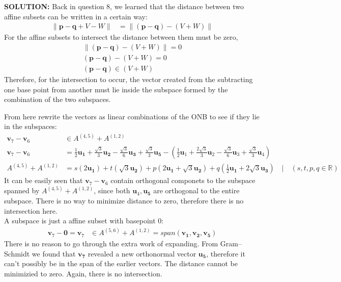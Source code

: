 \documentclass[12pt]{article}
\begin{document}
\begin{enumerate}
          \textbf{SOLUTION:}
          Back in question 8, we learned that the distance between two affine subsets can be written in a certain way:
          \begin{align*}
              \| \mathbf{p}-\mathbf{q} + V - W \| & = \|(\mathbf{p}-\mathbf{q}) - (V + W)\|
          \end{align*}
          For the affine subsets to intersect the distance between them must be zero,
          \begin{align*}
              \|(\mathbf{p}-\mathbf{q}) - (V + W)\| = 0 \\
              (\mathbf{p}-\mathbf{q}) - (V + W) = 0     \\
              (\mathbf{p}-\mathbf{q}) \in{} (V+W)
          \end{align*}
          Therefore, for the intersection to occur, the vector created from the subtracting one base point from another must lie inside the subspace formed by the combination of the two subspaces.

          From here rewrite the vectors as linear combinations of the ONB to see if they lie in the subspaces:
          \begin{align*}
              \mathbf{v}_7-\mathbf{v}_6 & \in{} A^{(4,5)} + A^{(1,2)}                                                                                                               \\
              \mathbf{v}_7-\mathbf{v}_6 & = \tfrac{1}{2}\mathbf{u_1} + \tfrac{\sqrt{3}}{3}\mathbf{u_2} - \tfrac{\sqrt{3}}{6}\mathbf{u_3} + \tfrac{\sqrt{3}}{3}\mathbf{u_5}-
              (\tfrac{1}{2}\mathbf{u}_1 + \tfrac{2\sqrt{3}}{3}\mathbf{u}_2 - \tfrac{\sqrt{3}}{6}\mathbf{u}_3 + \tfrac{\sqrt{3}}{3}\mathbf{u}_4)                                     \\
              A^{(4,5)} + A^{(1,2)}     & = s(2\mathbf{u_1}) + t(\sqrt{3}\mathbf{u_2})+ p(2\mathbf{u_1}+\sqrt{3}\mathbf{u_2}) + q(\tfrac{1}{2}\mathbf{u_1} + 2\sqrt{3}\mathbf{u_3})
              \quad{} | \quad{} (s,t,p,q \in{} \mathbb{R})
          \end{align*}
          It can be easily seen that $\mathbf{v}_7-\mathbf{v}_6$ contain orthogonal componets to the subspace spanned by $ A^{(4,5)} + A^{(1,2)}$, since both $\mathbf{u}_4, \mathbf{u_5}$ are orthogonal to the entire subspace.
          There is no way to minimize distance to zero, therefore there is no intersection here. \\

          A subspace is just a affine subset with basepoint 0:
          \begin{align*}
              \mathbf{v}_7-\mathbf{0} = \mathbf{v}_7 & \in{} A^{(5,6)} + A^{(1,2)} = span(\mathbf{v_1},\mathbf{v_2}, \mathbf{v_5})
          \end{align*}
          There is no reason to go through the extra work of expanding.
          From Gram–Schmidt we found that $\mathbf{v_7}$ revealed a new orthonormal vector \(\mathbf{u_5}\), therefore it can't possibly be in the span of the earlier vectors.
          The distance cannot be minimizied to zero.
          Again, there is no intersection.


\end{enumerate}
\end{document}
